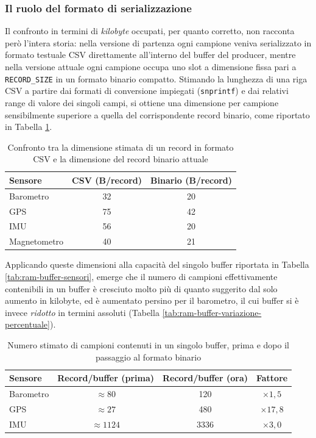 \subsubsection{Il ruolo del formato di serializzazione}
Il confronto in termini di \textit{kilobyte} occupati, per quanto corretto, non
racconta però l'intera storia: nella versione di partenza ogni campione
veniva serializzato in formato testuale CSV direttamente all'interno del
buffer del producer, mentre nella versione attuale ogni campione occupa
uno slot a dimensione fissa pari a \texttt{RECORD\_SIZE} in un formato
binario compatto. Stimando la lunghezza di una riga CSV a partire dai
formati di conversione impiegati (\texttt{snprintf}) e dai relativi range
di valore dei singoli campi, si ottiene una dimensione per campione
sensibilmente superiore a quella del corrispondente record binario, come
riportato in Tabella \ref{tab:csv-vs-binary-record}.

\begin{table}[H]
    \centering
    \begin{tabular}{l c c}
        \hline
        \textbf{Sensore} & \textbf{CSV (B/record)} & \textbf{Binario (B/record)} \\
        \hline
        Barometro & 32 & 20 \\
        GPS & 75 & 42 \\
        IMU & 56 & 20 \\
        Magnetometro & 40 & 21 \\
        \hline
    \end{tabular}
    \caption{Confronto tra la dimensione stimata di un record in formato CSV e la dimensione del record binario attuale}
    \label{tab:csv-vs-binary-record}
\end{table}

Applicando queste dimensioni alla capacità del singolo buffer riportata in
Tabella \ref{tab:ram-buffer-sensori}, emerge che il numero di campioni
effettivamente contenibili in un buffer è cresciuto molto più di quanto
suggerito dal solo aumento in kilobyte, ed è aumentato persino per il
barometro, il cui buffer si è invece \textit{ridotto} in termini assoluti
(Tabella \ref{tab:ram-buffer-variazione-percentuale}).

\begin{table}[H]
    \centering
    \begin{tabular}{l c c c}
        \hline
        \textbf{Sensore} & \textbf{Record/buffer (prima)} & \textbf{Record/buffer (ora)} & \textbf{Fattore} \\
        \hline
        Barometro & $\approx 80$ & 120 & $\times 1{,}5$ \\
        GPS & $\approx 27$ & 480 & $\times 17{,}8$ \\
        IMU & $\approx 1124$ & 3336 & $\times 3{,}0$ \\
        \hline
    \end{tabular}
    \caption{Numero stimato di campioni contenuti in un singolo buffer, prima e dopo il passaggio al formato binario}
    \label{tab:record-per-buffer}
\end{table}

